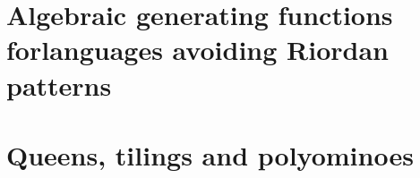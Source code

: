\documentclass{tufte-book}
\begin{document}
\chapter{Algebraic generating functions for\newline languages avoiding Riordan patterns}
\label{ch:algebraic-gfs-languages-avoiding-Riordan-patterns}



\chapter{Queens, tilings and polyominoes}
\label{ch:queens-tilings-polyominoes}




\backmatter

%
%

%

\printindex
\end{document}
